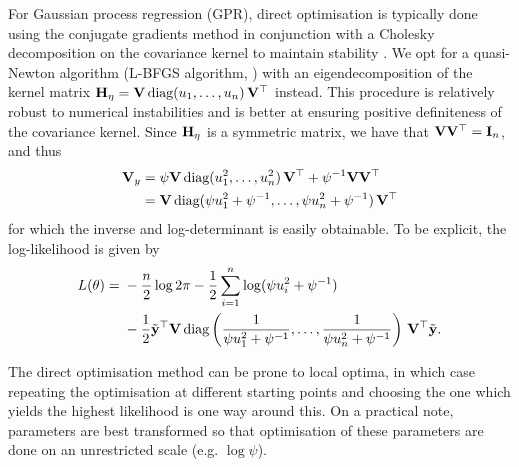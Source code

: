 For Gaussian process regression (GPR), direct optimisation is typically done using the conjugate gradients method in conjunction with a Cholesky decomposition on the covariance kernel to maintain stability \citep{rasmussen2006gaussian}. 
We opt for a quasi-Newton algorithm (L-BFGS algorithm, \cite{nocedal2006numerical})  with an eigendecomposition of the kernel matrix $\bH_{\eta} = \bV \, \text{diag}(u_1,\dots,u_n) \, \bV^\top$ instead.
This procedure is relatively robust to numerical instabilities and is better at ensuring positive definiteness of the covariance kernel.
Since $\bH_{\eta}$ is a symmetric matrix, we have that $\bV\bV^\top = \bI_n$, and thus
\begingroup
\setlength{\abovedisplayskip}{6pt}
\setlength{\belowdisplayskip}{8pt}
\begin{align*}
  \bV_y 
  &= \psi\bV \, \text{diag}(u_1^2,\dots,u_n^2) \, \bV^\top + \psi^{-1} \bV\bV^\top \\
  &= \bV \, \text{diag} (\psi u_1^2 + \psi^{-1},\dots,\psi u_n^2 + \psi^{-1}) \, \bV^\top 
\end{align*}
\endgroup
for which the inverse and log-determinant is easily obtainable.
To be explicit, the log-likelihood is given by
\begingroup
\setlength{\abovedisplayskip}{8pt}
\setlength{\belowdisplayskip}{6pt}
  \begin{align}
    \begin{split}
      L(\theta) 
      ={}& -\half[n]\log 2\pi - \half\sum_{i=1}^n\log(\psi u_i^2 + \psi^{-1}) \\
      &- \half \tilde\by^\top \bV \, \text{diag} \left(\frac{1}{\psi u_1^2 + \psi^{-1}},\dots,\frac{1}{\psi u_n^2 + \psi^{-1}}\right) \, \bV^\top \tilde\by.
    \end{split}
  \end{align}
\endgroup

The direct optimisation method can be prone to local optima, in which case repeating the optimisation at different starting points and choosing the one which yields the highest likelihood is one way around this.
On a practical note, parameters are best transformed so that optimisation of these parameters are done on an unrestricted scale (e.g. $\log \psi$).

